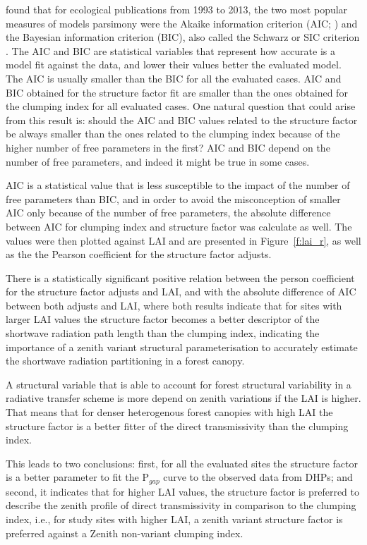 \citet{Aho2014} found that for ecological publications from 1993 to 2013, the two most popular measures of model\textsinglequote s parsimony were the Akaike information criterion (AIC; \citet{Akaike1973}) and the Bayesian information criterion (BIC), also called the Schwarz or SIC criterion \citep{Schwarz1978}. The AIC and BIC are statistical variables that represent how accurate is a model fit against the data, and lower their values better the evaluated model. The AIC is usually smaller than the BIC for all the evaluated cases. AIC and BIC obtained for the structure factor fit are smaller than the ones obtained for the clumping index for all evaluated cases. One natural question that could arise from this result is: should the AIC and BIC values related to the structure factor be always smaller than the ones related to the clumping index because of the higher number of free parameters in the first? AIC and BIC depend on the number of free parameters, and indeed it might be true in some cases.

AIC is a statistical value that is less susceptible to the impact of the number of free parameters than BIC, and in order to avoid the misconception of smaller AIC only because of the number of free parameters, the absolute difference between AIC for clumping index and structure factor was calculate as well. The values were then plotted against LAI and are presented in Figure~\ref{f:lai_r}, as well as the the Pearson coefficient for the structure factor adjusts.

There is a statistically significant positive relation between the person coefficient for the structure factor adjusts and LAI, and with the absolute difference of AIC between both adjusts and LAI, where both results indicate that for sites with larger LAI values the structure factor becomes a better descriptor of the shortwave radiation path length than the clumping index, indicating  the importance of a zenith variant structural parameterisation to accurately estimate the shortwave radiation partitioning in a forest canopy.

A structural variable that is able to account for forest structural variability in a radiative transfer scheme is more depend on zenith variations if the LAI is higher. That means that for denser heterogenous forest canopies with high LAI the structure factor is a better fitter of the direct transmissivity than the clumping index. 
 
This leads to two conclusions: first, for all the evaluated sites the structure factor is a better parameter to fit the P$_{gap}$ curve to the observed data from DHPs; and second, it indicates that for higher LAI values, the structure factor is preferred to describe the zenith profile of direct transmissivity in comparison to the clumping index, i.e., for study sites with higher LAI, a zenith variant structure factor is preferred against a Zenith non-variant clumping index. 


